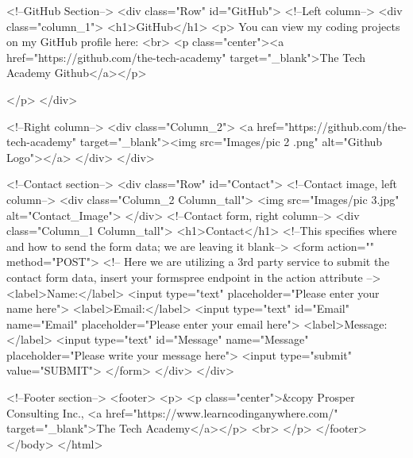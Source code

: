                     <!--GitHub Section-->
                    <div class="Row" id="GitHub">
                        <!--Left column-->
                        <div class="column_1">
                            <h1>GitHub</h1>
                            <p>
                                You can view my coding projects on my GitHub profile here:
                                <br>
                                <p class="center"><a href="https://github.com/the-tech-academy" target="_blank">The Tech Academy Github</a></p>
                                
                            </p>
                        </div>


                        <!--Right column-->
                        <div class="Column_2">
                            <a href="https://github.com/the-tech-academy" target="_blank"><img src="Images/pic 2 .png" alt="Github Logo"></a>
                        </div>
                    </div>

                    <!--Contact section-->
        <div class="Row" id="Contact">
            <!--Contact image, left column-->
            <div class="Column_2 Column_tall">
                <img src="Images/pic 3.jpg" alt="Contact_Image">
            </div>
            <!--Contact form, right column-->
            <div class="Column_1 Column_tall">
                <h1>Contact</h1>
                <!--This specifies where and how to send the form data; we are leaving it blank-->
                <form action="" method="POST"> <!-- Here we are utilizing a 3rd party service to submit the contact form data, insert your formspree endpoint in the action attribute -->
                    <label>Name:</label>
                        <input type="text" placeholder="Please enter your name here">
                    <label>Email:</label>
                        <input type="text" id="Email" name="Email" placeholder="Please enter your email here">
                    <label>Message:</label>
                        <input type="text" id="Message" name="Message" placeholder="Please write your message here">
                        <input type="submit" value="SUBMIT">
                </form>
            </div>
        </div>

       <!--Footer section-->
        <footer>
            <p>
                <p class="center">&copy Prosper Consulting Inc., <a href="https://www.learncodinganywhere.com/" target="_blank">The Tech Academy</a></p>
                <br>
            </p>
        </footer>
    </body>
    </html>

                                

